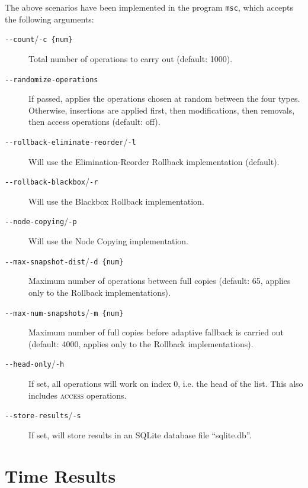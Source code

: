 The above scenarios have been implemented in the program \texttt{msc}, which
accepts the following arguments:

\begin{description}

  \item[\texttt{-\@{}-count}/\texttt{-c \{num\}}] Total number of operations to
  carry out (default: 1000).

  \item[\texttt{-\@{}-randomize-operations}] If passed, applies the operations
  chosen at random between the four types. Otherwise, insertions are applied
  first, then modifications, then removals, then access operations (default:
  off).

  \item[\texttt{-\@{}-rollback-eliminate-reorder}/\texttt{-l}] Will use the
  Elimination-Reorder Rollback implementation (default).

  \item[\texttt{-\@{}-rollback-blackbox}/\texttt{-r}] Will use the Blackbox
  Rollback implementation.

  \item[\texttt{-\@{}-node-copying}/\texttt{-p}] Will use the Node Copying
  implementation.

  \item[\texttt{-\@{}-max-snapshot-dist}/\texttt{-d \{num\}}] Maximum number of
  operations between full copies (default: 65, applies only to the Rollback
  implementations).

  \item[\texttt{-\@{}-max-num-snapshots}/\texttt{-m \{num\}}] Maximum number of
  full copies before adaptive fallback is carried out (default: 4000, applies
  only to the Rollback implementations).

  \item[\texttt{-\@{}-head-only}/\texttt{-h}] If set, all operations will work
  on index 0, i.e. the head of the list. This also includes \textsc{access}
  operations.

  \item[\texttt{-\@{}-store-results}/\texttt{-s}] If set, will store results in
  an SQLite database file ``sqlite.db''.
  
\end{description}

\section{Time Results}
\label{sec:time-results}


